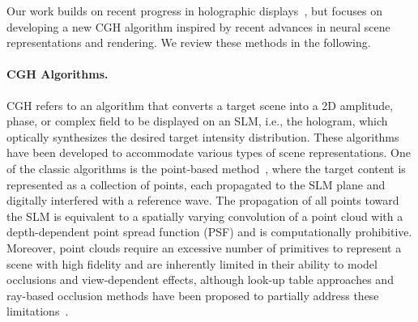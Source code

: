 Our work builds on recent progress in holographic displays~\cite{yaracs2010state,park2017recent,chang2020toward,javidi2021roadmap}, but focuses on developing a new CGH algorithm inspired by recent advances in neural scene representations and rendering. We review these methods in the following.

\paragraph{\bf{CGH Algorithms.}}
CGH refers to an algorithm that converts a target scene into a 2D amplitude, phase, or complex field to be displayed on an SLM, i.e., the hologram, which optically synthesizes the desired target intensity distribution. These algorithms have been developed to accommodate various types of scene representations. One of the classic algorithms is the point-based method~\cite{maimone2017holographic, h2009computer, lucente1993interactive}, where the target content is represented as a collection of points, each propagated to the SLM plane and digitally interfered with a reference wave. The propagation of all points toward the SLM is equivalent to a spatially varying convolution of a point cloud with a depth-dependent point spread function (PSF) and is computationally prohibitive. Moreover, point clouds require an excessive number of primitives to represent a scene with high fidelity and are inherently limited in their ability to model occlusions and view-dependent effects, although look-up table approaches and ray-based occlusion methods have been proposed to partially address these limitations~\cite{kim2008effective, lucente1993interactive, h2009computer, shi2021towards}.

